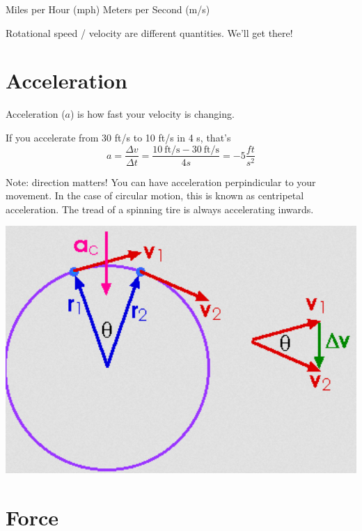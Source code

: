 \documentclass{article}%
\newenvironment{alertblock}[1]{
	\tcolorbox[beamer,
	noparskip,breakable,
	colback=LightGreen,colframe=DarkGreen,
	colbacklower=LimeGreen!75!LightGreen,
	title=#1]}
	{\endtcolorbox}
\newenvironment{example}{
	\tcolorbox[beamer,
	noparskip,breakable,
	colback=LightGreen,colframe=DarkGreen,
	colbacklower=LimeGreen!75!LightGreen,
	title=Examples]}
	{\endtcolorbox}
\begin{document}
\begin{example}
\begin{outline}
	\1 Miles per Hour (mph)
	\1 Meters per Second (m/s)
\end{outline}
\end{example}

\begin{alertblock}{Warning}
	Rotational speed / velocity are different quantities. We'll get there!
\end{alertblock}

\section{Acceleration}

Acceleration ($a$) is how fast your velocity is changing.

If you accelerate from 30 ft/s to 10 ft/s in 4 s, that's
\begin{equation}
	a = \frac{\Delta v}{\Delta t} = \frac{10 \ \mbox{ft/s} - 30 \ \mbox{ft/s}}{4 s} = - 5 \frac{ft}{s^2} \nonumber
\end{equation} 

Note: direction matters! You can have acceleration perpindicular to your movement. In the case of circular motion, this is known as centripetal acceleration. The tread of a spinning tire is always accelerating inwards.

\includegraphics[width=1.0\textwidth]{img_Mechatronics_Terminology_centrip.png}

\section{Force}
\end{document}

